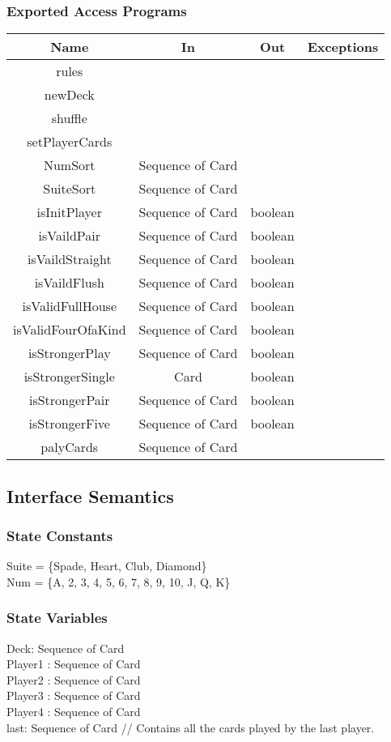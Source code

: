 \documentclass[12pt, titlepage]{article}
\begin{document}
\subsubsection{Exported Access Programs}
\begin{tabular}[pos]{|c|c|c|c|}
\hline
\textbf{Name}& \textbf{In} & \textbf{Out} & \textbf{Exceptions} \\ \hline
rules & ~ & ~ & ~ \\ \hline
newDeck & ~ & ~ & ~ \\ \hline
shuffle & ~ & ~ & ~ \\ \hline
setPlayerCards & ~ & ~ & ~\\ \hline
NumSort & Sequence of Card & ~ & ~\\ \hline
SuiteSort & Sequence of Card & ~ & ~ \\ \hline
isInitPlayer & Sequence of Card & boolean & ~ \\ \hline
isVaildPair & Sequence of Card & boolean & ~ \\ \hline
isVaildStraight & Sequence of Card & boolean & ~\\ \hline
isVaildFlush & Sequence of Card & boolean & ~ \\ \hline
isValidFullHouse &  Sequence of Card & boolean & ~ \\ \hline
isValidFourOfaKind &  Sequence of Card & boolean & ~ \\ \hline
isStrongerPlay & Sequence of Card & boolean & ~ \\ \hline
isStrongerSingle & Card & boolean & ~ \\ \hline
isStrongerPair & Sequence of Card& boolean & ~ \\ \hline
isStrongerFive & Sequence of Card & boolean & ~ \\ \hline
palyCards & Sequence of Card & ~ & ~ \\ \hline
\end{tabular}
\subsection{Interface Semantics}
\subsubsection{State Constants}
Suite = \{Spade, Heart, Club, Diamond\} \\
\noindent Num = \{A, 2, 3, 4, 5, 6, 7, 8, 9, 10, J, Q, K\}
\subsubsection{State Variables}
Deck: Sequence of Card\\
\noindent Player1 : Sequence of Card\\
\noindent Player2 : Sequence of Card\\
\noindent Player3 : Sequence of Card\\
\noindent Player4 : Sequence of Card\\
\noindent last: Sequence of Card // Contains all the cards played by the last player.
\end{document}
